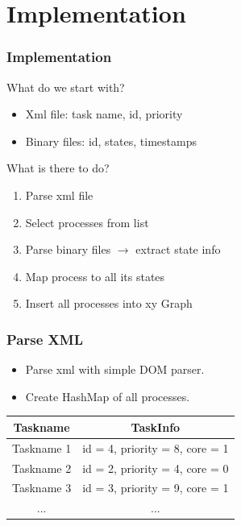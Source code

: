 \documentclass{beamer}
\begin{document}
\section{Implementation}
\begin{frame}
	\frametitle{Implementation}
	\begin{block}{What do we start with?}
		\begin{itemize}
		\item Xml file: task name, id, priority
		\item Binary files: id, states, timestamps
		\end{itemize}
	\end{block}
\end{frame}

\begin{frame}
	\begin{block}{What is there to do?}
		\begin{enumerate}
			\item Parse xml file
			\item Select processes from list
			\item Parse binary files $\rightarrow$ extract state info
			\item Map process to all its states
			\item Insert all processes into xy Graph
		\end{enumerate} 
	\end{block}
\end{frame}

\begin{frame}
	\frametitle{Parse XML}
	\begin{itemize}
		\item Parse xml with simple DOM parser.\\
		\item Create HashMap of all processes.\\ 
	\end{itemize}
	
	\begin{tabular}{|c|c|}
		\hline 
		\textbf{Taskname} & \textbf{TaskInfo} \\ 
		\hline 
		Taskname 1 & id = 4, priority = 8, core = 1 \\ 
		\hline 
		Taskname 2 & id = 2, priority = 4, core = 0 \\ 
		\hline 
		Taskname 3 & id = 3, priority = 9, core = 1  \\ 
		\hline 
		...    & ...  \\ 
		\hline 
	\end{tabular} 
\end{frame}
\end{document}
